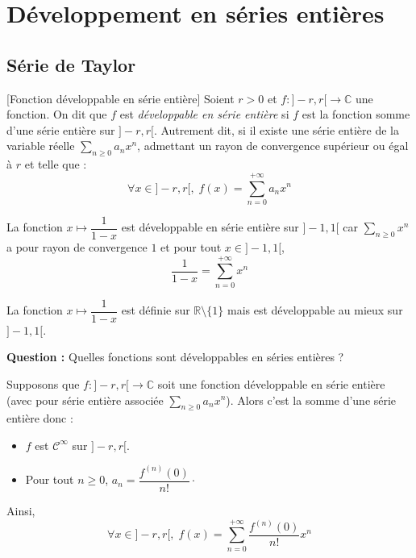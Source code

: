 \documentclass[french,11pt,twoside]{VcCours}
\begin{document}
\begin{Demonstration}{}

\vspace*{ 3cm}
\end{Demonstration}

\section{Développement en séries entières}
\subsection{Série de Taylor}

\begin{Definition}{}[Fonction développable en série entière]
Soient $r>0$ et $f : ]-r,r[ \rightarrow \mathbb{C}$ une fonction. On dit que $f$ est \emph{développable en série entière} si $f$ est la fonction somme d'une série entière sur $]-r,r[$. Autrement dit, si il existe une série entière de la variable réelle $\sum_{n \geq 0} a_n x^n$, admettant un rayon de convergence supérieur ou égal à $r$ et telle que :
$$ \forall x \in ]-r,r[, \; f(x) = \sum_{n=0}^{+ \infty} a_n x^n$$
\end{Definition}

\begin{Exemple}{} La fonction $x \mapsto \dfrac{1}{1-x}$ est développable en série entière sur $]-1,1[$ car $\sum_{n \geq 0} x^n$ a pour rayon de convergence $1$ et pour tout $x \in ]-1,1[$,
$$ \frac{1}{1-x}= \sum_{n=0}^{+ \infty} x^n$$
\end{Exemple}

\begin{Remarque}[\alerte]{} La fonction $x \mapsto \dfrac{1}{1-x}$ est définie sur $\mathbb{R} \setminus \lbrace 1 \rbrace$ mais est développable au mieux sur $]-1,1[$.
\end{Remarque}

\medskip

\textbf{Question :} Quelles fonctions sont développables en séries entières ?

\medskip

Supposons que $f : ]-r,r[ \rightarrow \mathbb{C}$ soit une fonction développable en série entière (avec pour série entière associée $\sum_{n \geq 0} a_n x^n$). Alors c'est la somme d'une série entière donc :
\begin{itemize}
\item $f$ est $\mathcal{C}^{\infty}$ sur $]-r,r[$.
\item Pour tout $n \geq 0$, $a_n = \dfrac{f^{(n)}(0)}{n!} \cdot$
\end{itemize}
Ainsi,
$$ \forall x \in ]-r,r[, \; f(x)= \sum_{n=0}^{+ \infty} \dfrac{f^{(n)}(0)}{n!}  x^n$$
\end{document}
